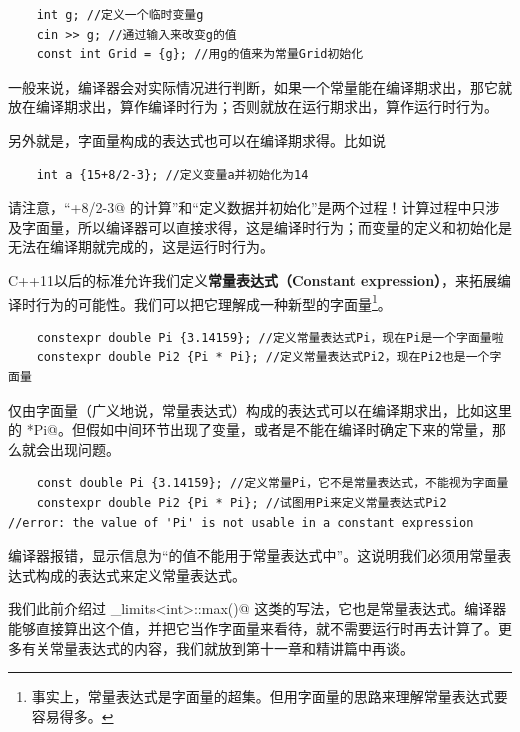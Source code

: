 \begin{lstlisting}
    int g; //定义一个临时变量g
    cin >> g; //通过输入来改变g的值
    const int Grid = {g}; //用g的值来为常量Grid初始化
\end{lstlisting}
一般来说，编译器会对实际情况进行判断，如果一个常量能在编译期求出，那它就放在编译期求出，算作编译时行为；否则就放在运行期求出，算作运行时行为。\par
另外就是，字面量构成的表达式也可以在编译期求得。比如说
\begin{lstlisting}
    int a {15+8/2-3}; //定义变量a并初始化为14
\end{lstlisting}
请注意，``+8/2-3@ 的计算''和``定义数据并初始化''是两个过程！计算过程中只涉及字面量，所以编译器可以直接求得，这是编译时行为；而变量的定义和初始化是无法在编译期就完成的，这是运行时行为。\par
C++11以后的标准允许我们定义\textbf{常量表达式（Constant expression）}，来拓展编译时行为的可能性。我们可以把它理解成一种新型的字面量\footnote{事实上，常量表达式是字面量的超集。但用字面量的思路来理解常量表达式要容易得多。}。
\begin{lstlisting}
    constexpr double Pi {3.14159}; //定义常量表达式Pi，现在Pi是一个字面量啦
    constexpr double Pi2 {Pi * Pi}; //定义常量表达式Pi2，现在Pi2也是一个字面量
\end{lstlisting}
仅由字面量（广义地说，常量表达式）构成的表达式可以在编译期求出，比如这里的 \lstinline@Pi*Pi@。但假如中间环节出现了变量，或者是不能在编译时确定下来的常量，那么就会出现问题。
\begin{lstlisting}
    const double Pi {3.14159}; //定义常量Pi，它不是常量表达式，不能视为字面量
    constexpr double Pi2 {Pi * Pi}; //试图用Pi来定义常量表达式Pi2
//error: the value of 'Pi' is not usable in a constant expression
\end{lstlisting}
编译器报错，显示信息为``\lstinline@Pi@ 的值不能用于常量表达式中''。这说明我们必须用常量表达式构成的表达式来定义常量表达式。\par
我们此前介绍过 \lstinline@numeric_limits<int>::max()@ 这类的写法，它也是常量表达式。编译器能够直接算出这个值，并把它当作字面量来看待，就不需要运行时再去计算了。更多有关常量表达式的内容，我们就放到第十一章和精讲篇中再谈。\par
